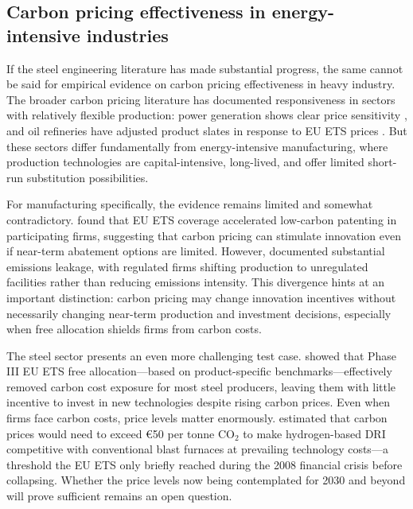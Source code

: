 \subsection{Carbon pricing effectiveness in energy-intensive industries}

If the steel engineering literature has made substantial progress, the same cannot be said for empirical evidence on carbon pricing effectiveness in heavy industry. The broader carbon pricing literature has documented responsiveness in sectors with relatively flexible production: power generation shows clear price sensitivity \citep{jarke2017carbon}, and oil refineries have adjusted product slates in response to EU ETS prices \citep{fowlie2016carbon}. But these sectors differ fundamentally from energy-intensive manufacturing, where production technologies are capital-intensive, long-lived, and offer limited short-run substitution possibilities.

For manufacturing specifically, the evidence remains limited and somewhat contradictory. \citet{calel2016innovation} found that EU ETS coverage accelerated low-carbon patenting in participating firms, suggesting that carbon pricing can stimulate innovation even if near-term abatement options are limited. However, \citet{martin2016industry} documented substantial emissions leakage, with regulated firms shifting production to unregulated facilities rather than reducing emissions intensity. This divergence hints at an important distinction: carbon pricing may change innovation incentives without necessarily changing near-term production and investment decisions, especially when free allocation shields firms from carbon costs.

The steel sector presents an even more challenging test case. \citet{sartor2012benchmark} showed that Phase III EU ETS free allocation—based on product-specific benchmarks—effectively removed carbon cost exposure for most steel producers, leaving them with little incentive to invest in new technologies despite rising carbon prices. Even when firms face carbon costs, price levels matter enormously. \citet{demailly2018european} estimated that carbon prices would need to exceed €50 per tonne CO$_2$ to make hydrogen-based DRI competitive with conventional blast furnaces at prevailing technology costs—a threshold the EU ETS only briefly reached during the 2008 financial crisis before collapsing. Whether the price levels now being contemplated for 2030 and beyond will prove sufficient remains an open question.


